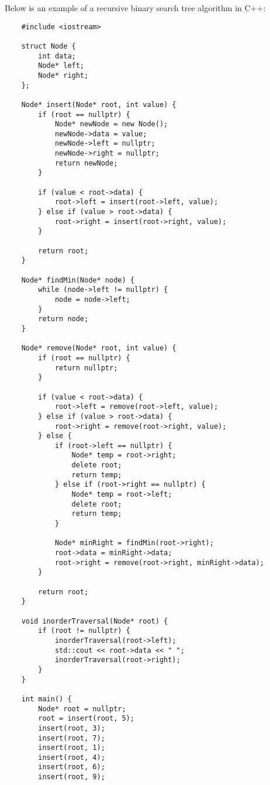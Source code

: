 \begin{solution}
    Below is an example of a recursive binary search tree algorithm in C++:

    \horizontalline

    \begin{verbatim}
    #include <iostream>
    
    struct Node {
        int data;
        Node* left;
        Node* right;
    };
    
    Node* insert(Node* root, int value) {
        if (root == nullptr) {
            Node* newNode = new Node();
            newNode->data = value;
            newNode->left = nullptr;
            newNode->right = nullptr;
            return newNode;
        }
    
        if (value < root->data) {
            root->left = insert(root->left, value);
        } else if (value > root->data) {
            root->right = insert(root->right, value);
        }
    
        return root;
    }
    
    Node* findMin(Node* node) {
        while (node->left != nullptr) {
            node = node->left;
        }
        return node;
    }
    
    Node* remove(Node* root, int value) {
        if (root == nullptr) {
            return nullptr;
        }
    
        if (value < root->data) {
            root->left = remove(root->left, value);
        } else if (value > root->data) {
            root->right = remove(root->right, value);
        } else {
            if (root->left == nullptr) {
                Node* temp = root->right;
                delete root;
                return temp;
            } else if (root->right == nullptr) {
                Node* temp = root->left;
                delete root;
                return temp;
            }
    
            Node* minRight = findMin(root->right);
            root->data = minRight->data;
            root->right = remove(root->right, minRight->data);
        }
    
        return root;
    }
    
    void inorderTraversal(Node* root) {
        if (root != nullptr) {
            inorderTraversal(root->left);
            std::cout << root->data << " ";
            inorderTraversal(root->right);
        }
    }
    
    int main() {
        Node* root = nullptr;
        root = insert(root, 5);
        insert(root, 3);
        insert(root, 7);
        insert(root, 1);
        insert(root, 4);
        insert(root, 6);
        insert(root, 9);
    

\end{verbatim}
\end{solution}
